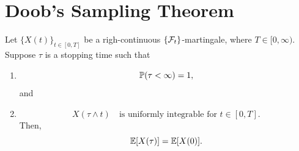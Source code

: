
\section{Doob's Sampling Theorem}
\label{Appendix: Doob's Sampling Theorem}
\begin{theorem}
    Let $\{X(t)\}_{t \in [0,T]}$ be a righ-continuous $\{\mathcal{F}_t\}$-martingale, where $T \in [0,\infty)$. Suppose $\tau$ is a stopping time such that 
    \begin{enumerate}[label=(\roman*)]
        \item 
        \begin{equation}
            \mathbb{P}(\tau < \infty) = 1,
            \label{eqn: Optional Sampling Theorem (cond. i)}
        \end{equation}
        and
        \item 
        \begin{equation}
            X(\tau \wedge t) \quad \text{is uniformly integrable for } t \in [0,T].
            \label{eqn: Optional Sampling Theorem (cond. i)}
        \end{equation}
        Then,
        \begin{equation*}
            \mathbb{E}[X(\tau)] = \mathbb{E}[X(0)].
        \end{equation*}
    \end{enumerate}
\end{theorem}


